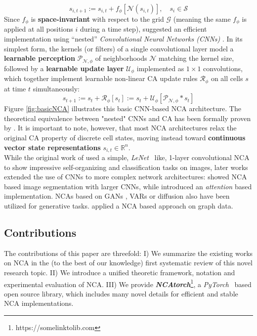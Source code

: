 \documentclass[10pt]{article} %
\begin{document}
\begin{equation}
s_{i,t+1}:=s_{i,t}+f_\phi[\mathcal{N}(s_{i,t})], \quad s_i \in \mathcal{S}
\label{eq:nn_update}
\end{equation}
Since $f_\phi$ is \textbf{space-invariant} with respect to the grid $\mathcal{G}$ (meaning the same $f_\phi$ is applied at all positions $i$ during a time step), \citep{mordvintsev2020growing} suggested an efficient implementation using ``nested'' \textit{Convolutional Neural Networks (CNNs)} \citep{lecun1998convolutional}. In its simplest form, the kernels (or filters) of a single convolutional layer model a \textbf{learnable perception} $\mathcal{P}_{\mathcal{N},\phi}$ of neighborhoods $\mathcal{N}$ matching the kernel size, followed by a \textbf{learnable update layer} $\mathcal{U}_\phi$ implemented as $1\times 1$ convolutions, which together implement learnable non-linear CA update rules $\mathcal{R_\phi}$ on all cells $s$ at time $t$ simultaneously:
\begin{equation}
s_{t+1}:=s_{t}+\mathcal{R_\phi}[s_t] := s_{t}+\mathcal{U}_\phi[\mathcal{P}_{\mathcal{N},\phi}*s_{t}]
\label{eq:cnn_update}
\end{equation}
Figure \ref{fig:basicNCA} illustrates this basic CNN-based NCA architecture. The theoretical equivalence between "nested" CNNs and CA has been formally proven by \citep{gilpin2019cellular}. It is important to note, however, that most NCA architectures relax the original CA property of discrete cell states, moving instead toward \textbf{continuous vector state representations} $s_{i,t}\in\mathbb{R}^n$.\\
%
While the original work of \citep{mordvintsev2020growing} used a simple, \textit{LeNet}~\citep{lecun2002gradient} like,  1-layer convolutional NCA to show impressive self-organizing and classification tasks on images, later works extended the use of CNNs to more complex network architectures: \citep{sandler2020image} showed NCA based image segmentation with larger CNNs, while \citep{tesfaldet2022attention} introduced an \textit{attention} based implementation. NCAs based on GANs \citep{otte2021generative}, VARs \citep{palm2022variational} or diffusion \citep{kalkhof2024frequency} also have been utilized for generative tasks. \citep{grattarola2021learning} applied a NCA based approach on graph data. 
\subsection{Contributions}
The contributions of this paper are threefold: I) We summarize the existing works on NCA in the (to the best of our knowledge) first systematic review of this novel research topic. II) We introduce a unified theoretic framework, notation and experimental evaluation of NCA. III) We provide \textit{\textbf{NCAtorch}}\footnote{https://somelinktolib.com}, a \textit{PyTorch}~\citep{paszke2019pytorch} based open source library, which includes many novel details for efficient and stable NCA implementations.   
\end{document}
